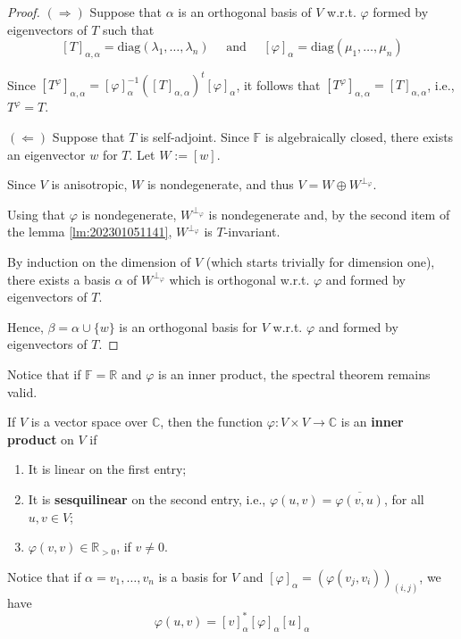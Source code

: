 \begin{proof}
  $(\Rightarrow)$ Suppose that $\alpha$ is an orthogonal basis of $V$ w.r.t. $\varphi$ formed by eigenvectors of $T$ such that 
  \[
    [T]_{\alpha, \alpha} = \text{diag}(\lambda_1, \ldots, \lambda_n) \quad \text{ and } \quad [\varphi]_\alpha = \text{diag}(\mu_1, \ldots, \mu_n)
  \]

  Since $[T^\varphi]_{\alpha, \alpha} = [\varphi]_\alpha^{-1} ([T]_{\alpha, \alpha})^t [\varphi]_\alpha$, it follows that $[T^\varphi]_{\alpha, \alpha} = [T]_{\alpha, \alpha}$, i.e., $T^\varphi = T$.

  $(\Leftarrow)$ Suppose that $T$ is self-adjoint. Since $\mathbb{F}$ is algebraically closed, there exists an eigenvector $w$ for $T$. Let $W := [w]$. 

  Since $V$ is anisotropic, $W$ is nondegenerate, and thus $V = W \oplus W^{\perp_\varphi}$. 

  Using that $\varphi$ is nondegenerate, $W^{\perp_\varphi}$ is nondegenerate and, by the second item of the lemma \ref{lm:202301051141}, $W^{\perp_\varphi}$ is $T$-invariant. 

  By induction on the dimension of $V$ (which starts trivially for dimension one), there exists a basis $\alpha$ of $W^{\perp_\varphi}$ which is orthogonal w.r.t. $\varphi$ and formed by eigenvectors of $T$. 

  Hence, $\beta = \alpha \cup \{ w \}$ is an orthogonal basis for $V$ w.r.t. $\varphi$ and formed by eigenvectors of $T$.
\end{proof}

Notice that if $\mathbb{F} = \mathbb{R}$ and $\varphi$ is an inner product, the spectral theorem remains valid. 

\begin{definition}
	If $V$ is a vector space over $\mathbb{C}$, then the function $\varphi : V \times V \longrightarrow \mathbb{C}$ is an \textbf{inner product} on $V$ if
	\begin{enumerate}
		\item It is linear on the first entry; 
		\item It is \textbf{sesquilinear} on the second entry, i.e., $\varphi(u,v) = \overline{\varphi(v,u)}$, for all $u, v \in V$; 
		\item $\varphi(v,v) \in \mathbb{R}_{> 0}$, if $v \neq 0$. 
	\end{enumerate}
\end{definition}

Notice that if $\alpha = v_1, \ldots, v_n$ is a basis for $V$ and $[\varphi]_\alpha = (\varphi(v_j, v_i))_{(i,j)}$, we have 
\[
	\varphi(u,v) = [v]_\alpha^\ast [\varphi]_\alpha [u]_\alpha 
\]

